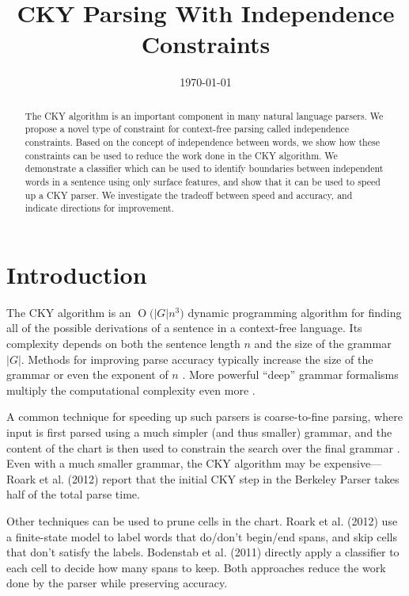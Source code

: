 \documentclass[11pt]{article}
\date{\today}
\title{CKY Parsing With Independence Constraints}
\newcommand{\BigO}[1]{\ensuremath{\operatorname{O}\bigl(#1\bigr)}}
\begin{document}
\maketitle

\begin{abstract}
The CKY algorithm is an important component in many natural language
parsers. We propose a novel type of constraint for context-free
parsing called independence constraints. Based on the concept
of independence between words, we show how these constraints can be
used to reduce the work done in the CKY algorithm. We demonstrate a
classifier which can be used to identify boundaries between
independent words in a sentence using only surface features, and show
that it can be used to speed up a CKY parser. We investigate the
tradeoff between speed and accuracy, and indicate directions for
improvement.
\end{abstract}

\section{Introduction}
\label{sec-1}



The CKY algorithm is an \BigO{|G|n^3} dynamic programming
algorithm for finding all of the possible derivations of a sentence in
a context-free language. Its complexity depends on both the sentence
length $n$ and the size of the grammar $|G|$. Methods for improving
parse accuracy typically increase the size of the grammar 
\cite{Klein2003,Petrov2007} or even the exponent of $n$ \cite{Eisner1999}. 
More powerful “deep” grammar formalisms multiply the computational
complexity even more \cite{Bangalore1999}.

A common technique for speeding up such parsers is coarse-to-fine
parsing, where input is first parsed using a much simpler (and thus
smaller) grammar, and the content of the chart is then used to
constrain the search over the final grammar
\cite{Torisawa2000,Charniak2005,Petrov2007}. Even with a much smaller
grammar, the CKY algorithm may be expensive---Roark et al. (2012)
report that the initial CKY step in the Berkeley Parser takes half of
the total parse time.

Other techniques can be used to prune cells in the chart. Roark et al.
(2012) use a finite-state model to label words that do/don't begin/end
spans, and skip cells that don't satisfy the labels. Bodenstab et al.
(2011) directly apply a classifier to each cell to decide how many
spans to keep. Both approaches reduce the work done by the parser
while preserving accuracy.
\end{document}
